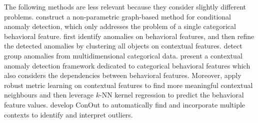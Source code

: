 \documentclass[pdflatex,sn-basic]{sn-jnl}%
\theoremstyle{thmstyleone}%
\theoremstyle{thmstyletwo}%
\theoremstyle{thmstylethree}%
\begin{document}


The following methods are less relevant because they consider slightly different problems. \cite{valko2011conditional} construct a non-parametric graph-based method for conditional anomaly detection, which only addresses the problem of a single categorical behavioral feature. \cite{hayes2014contextual} first identify anomalies on behavioral features, and then refine the detected anomalies by clustering all objects on contextual features. \cite{tang2015mining} detect group anomalies from multidimensional categorical data.  \cite{hong2015multivariate} present a contextual  anomaly detection framework dedicated to categorical behavioral features which also considers the dependencies between behavioral features. Moreover, \cite{zheng2017contextual} apply robust metric learning on contextual features to find more meaningful contextual neighbours and then leverage $k$-NN kernel regression to predict the behavioral feature values. \cite{meghanath2018conout} develop ConOut to automatically find and incorporate multiple contexts to identify and interpret outliers. 
\end{document}
